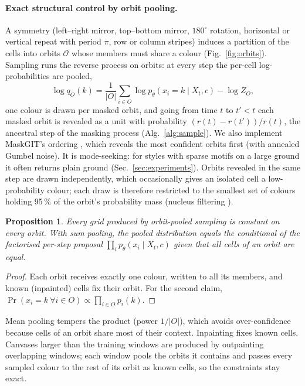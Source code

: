 \documentclass[11pt]{article}
\newtheorem{proposition}{Proposition}
\begin{document}
\paragraph{Exact structural control by orbit pooling.}
A symmetry (left--right mirror, top--bottom mirror, $180^\circ$ rotation, horizontal or vertical
repeat with period $\pi$, row or column stripes) induces a partition of the cells into orbits
$\mathcal{O}$ whose members must share a colour (Fig.~\ref{fig:orbits}). Sampling runs the reverse
process on orbits: at every step the per-cell log-probabilities are pooled,
\begin{equation}
\log q_O(k) = \frac{1}{|O|}\sum_{i\in O}\log p_\theta(x_i = k\mid X_t,c) - \log Z_O,
\end{equation}
one colour is drawn per masked orbit, and going from time $t$ to $t'<t$ each masked orbit is
revealed as a unit with probability $(r(t)-r(t'))/r(t)$, the ancestral step of the masking process
\cite{sahoo2024simple,shi2024simplified} (Alg.~\ref{alg:sample}). We also implement MaskGIT's
ordering \cite{chang2022maskgit}, which reveals the most confident orbits first (with annealed
Gumbel noise). It is mode-seeking: for styles with sparse motifs on a large ground it often returns
plain ground (Sec.~\ref{sec:experiments}). Orbits revealed in the same step are drawn independently,
which occasionally gives an isolated cell a low-probability colour; each draw is therefore restricted
to the smallest set of colours holding 95\,\% of the orbit's probability mass (nucleus filtering
\cite{holtzman2020curious}).

\begin{proposition}
Every grid produced by orbit-pooled sampling is constant on every orbit. With sum pooling, the
pooled distribution equals the conditional of the factorised per-step proposal
$\prod_i p_\theta(x_i\mid X_t,c)$ given that all cells of an orbit are equal.
\end{proposition}
\begin{proof}
Each orbit receives exactly one colour, written to all its members, and known (inpainted) cells fix
their orbit. For the second claim, $\Pr(x_i=k\ \forall i\in O)\propto\prod_{i\in O}p_i(k)$.
\end{proof}
Mean pooling tempers the product (power $1/|O|$), which avoids over-confidence because cells of an
orbit share most of their context. Inpainting fixes known cells. Canvases larger than the training
windows are produced by outpainting overlapping windows; each window pools the orbits it contains and
passes every sampled colour to the rest of its orbit as known cells, so the constraints stay exact.
\end{document}
